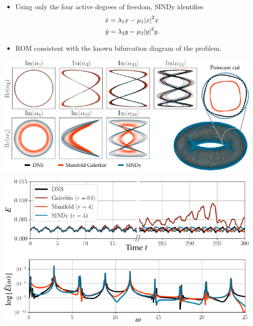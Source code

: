 \documentclass[aspectratio=169,compress,12pt]{beamer}
\begin{document}
\begin{frame}
    \vfill
    \begin{minipage}{.48\textwidth}
        \begin{itemize}
            \item Using only the four active degrees of freedom, SINDy identifies
            \[
            \begin{aligned}
                \dot{x} & = \lambda_1 x - \mu_1 \abs{x}^2 x \\
                \dot{y} & = \lambda_2 y - \mu_2 \abs{y}^2 y.
            \end{aligned}
            \]
            \item ROM consistent with the known bifurcation diagram of the problem.
        \end{itemize}
    \end{minipage}%
    \hfill
    \begin{minipage}{.48\textwidth}
        \centering
        \includegraphics[width=\textwidth]{imgs/sindy_attractor.png}
    \end{minipage}
    \vfill
\end{frame}

\begin{frame}
    \vfill
    \centering
    \includegraphics[width=.8\textwidth]{imgs/sindy_tke.png}
    \vfill
\end{frame}
\end{document}

